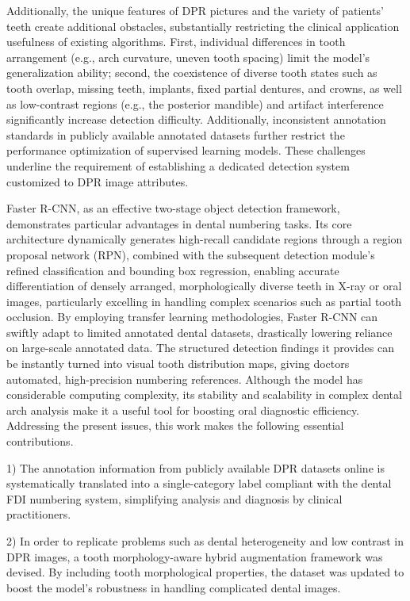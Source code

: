 \documentclass[pdflatex,sn-mathphys-num]{sn-jnl}%
\theoremstyle{thmstyleone}%
\theoremstyle{thmstyletwo}%
\theoremstyle{thmstylethree}%
\begin{document}
 Additionally, the unique features of DPR pictures and the variety of patients' teeth create additional obstacles, substantially restricting the clinical application usefulness of existing algorithms.  First, individual differences in tooth arrangement (e.g., arch curvature, uneven tooth spacing) limit the model's generalization ability\cite{i15}; second, the coexistence of diverse tooth states such as tooth overlap, missing teeth, implants, fixed partial dentures, and crowns, as well as low-contrast regions (e.g., the posterior mandible) and artifact interference significantly increase detection difficulty\cite{i16}.  Additionally, inconsistent annotation standards in publicly available annotated datasets further restrict the performance optimization of supervised learning models\cite{i17}.  These challenges underline the requirement of establishing a dedicated detection system customized to DPR image attributes. 

 Faster R-CNN, as an effective two-stage object detection framework, demonstrates particular advantages in dental numbering tasks.  Its core architecture dynamically generates high-recall candidate regions through a region proposal network (RPN), combined with the subsequent detection module's refined classification and bounding box regression, enabling accurate differentiation of densely arranged, morphologically diverse teeth in X-ray or oral images, particularly excelling in handling complex scenarios such as partial tooth occlusion.  By employing transfer learning methodologies, Faster R-CNN can swiftly adapt to limited annotated dental datasets, drastically lowering reliance on large-scale annotated data.  The structured detection findings it provides can be instantly turned into visual tooth distribution maps, giving doctors automated, high-precision numbering references.  Although the model has considerable computing complexity, its stability and scalability in complex dental arch analysis make it a useful tool for boosting oral diagnostic efficiency.  Addressing the present issues, this work makes the following essential contributions.

 1) The annotation information from publicly available DPR datasets online is systematically translated into a single-category label compliant with the dental FDI numbering system, simplifying analysis and diagnosis by clinical practitioners.

 2) In order to replicate problems such as dental heterogeneity and low contrast in DPR images, a tooth morphology-aware hybrid augmentation framework was devised.  By including tooth morphological properties, the dataset was updated to boost the model's robustness in handling complicated dental images.  
\end{document}
